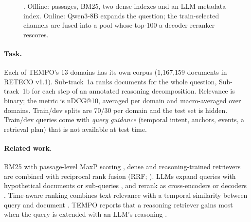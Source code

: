\begin{figure}[t]
{}
  \caption{\sys. Offline: passages, BM25, two dense indexes and an LLM metadata index. Online:
  Qwen3-8B expands the question; the train-selected channels are fused into a pool whose top-100
  a decoder reranker rescores.}
  \label{fig:overview}
\end{figure}

\paragraph{Task.} Each of TEMPO's 13 domains has its own corpus (1{,}167{,}159 documents in
RETECO v1.1). Sub-track~1a ranks documents for the whole question, Sub-track~1b for each step of
an annotated reasoning decomposition. Relevance is binary; the metric is nDCG@10, averaged per
domain and macro-averaged over domains. Train/dev splits are 70/30 per domain and the test set is
hidden. Train/dev queries come with \emph{query guidance} (temporal intent, anchors, events, a
retrieval plan) that is not available at test time.

\paragraph{Related work.} BM25 \citep{robertson2009bm25} with passage-level MaxP scoring
\citep{dai2019maxp}, dense \citep{karpukhin2020dpr,zhang2025qwen3emb} and reasoning-trained
retrievers \citep{su2025bright,shao2025reasonir} are combined with reciprocal rank fusion
(RRF; \citealp{cormack2009rrf}). LLMs expand queries with hypothetical documents
\citep{gao2023hyde,wang2023query2doc} or sub-queries \citep{rackauckas2024ragfusion}, and rerank
as cross-encoders \citep{nogueira2019passage} or decoders \citep{nogueira2020monot5,zhang2025qwen3emb}.
Time-aware ranking combines text relevance with a temporal similarity between query and document
\citep{campos2014survey,jones2007temporal}. TEMPO reports that a reasoning retriever gains most
when the query is extended with an LLM's reasoning \citep{abdallah2026tempo}.
